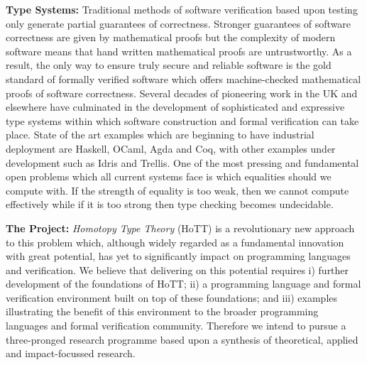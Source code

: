 \documentclass[a4paper,11pt]{article}
\begin{document}
{\bf Type Systems:} Traditional methods of software verification based
upon testing only generate partial guarantees of correctness. Stronger
guarantees of software correctness are given by mathematical proofs
but the complexity of modern software means that hand written
mathematical proofs are untrustworthy. As a result, the only way to
ensure truly secure and reliable software is the gold standard of
formally verified software which offers machine-checked mathematical
proofs of software correctness. Several decades of pioneering work in
the UK and elsewhere have culminated in the development of
sophisticated and expressive type systems within which software
construction and formal verification can take place. State of the art
examples which are beginning to have industrial deployment are
Haskell, OCaml, Agda and Coq, with other examples under development
such as Idris and Trellis. One of the most pressing and fundamental
open problems which all current systems face is which equalities
should we compute with. If the strength of equality is too weak, then
we cannot compute effectively while if it is too strong then type
checking becomes undecidable.




{\bf The Project:} {\em Homotopy Type Theory} (HoTT) is a
revolutionary new approach to this problem which, although  widely regarded as
a fundamental innovation with great potential, has yet to 
significantly impact on programming languages and verification.
We believe that delivering on this potential requires i) further
development of the foundations of HoTT; ii)
a programming language and formal verification environment built on
top of these foundations; and iii) examples illustrating the benefit
of this environment to the broader programming languages and formal
verification community. Therefore we intend to pursue a three-pronged
research programme based upon a synthesis of theoretical, applied and
impact-focussed research.
\end{document}
